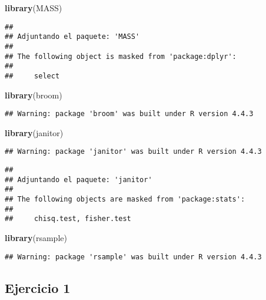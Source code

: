 \documentclass[
]{article}
\newenvironment{Shaded}{\begin{snugshade}}{\end{snugshade}}
\newcommand{\FunctionTok}[1]{\textcolor[rgb]{0.13,0.29,0.53}{\textbf{#1}}}
\newcommand{\NormalTok}[1]{#1}
\begin{document}
\begin{Shaded}
\begin{Highlighting}[]
\FunctionTok{library}\NormalTok{(MASS)}
\end{Highlighting}
\end{Shaded}

\begin{verbatim}
## 
## Adjuntando el paquete: 'MASS'
## 
## The following object is masked from 'package:dplyr':
## 
##     select
\end{verbatim}

\begin{Shaded}
\begin{Highlighting}[]
\FunctionTok{library}\NormalTok{(broom) }
\end{Highlighting}
\end{Shaded}

\begin{verbatim}
## Warning: package 'broom' was built under R version 4.4.3
\end{verbatim}

\begin{Shaded}
\begin{Highlighting}[]
\FunctionTok{library}\NormalTok{(janitor)   }
\end{Highlighting}
\end{Shaded}

\begin{verbatim}
## Warning: package 'janitor' was built under R version 4.4.3
\end{verbatim}

\begin{verbatim}
## 
## Adjuntando el paquete: 'janitor'
## 
## The following objects are masked from 'package:stats':
## 
##     chisq.test, fisher.test
\end{verbatim}

\begin{Shaded}
\begin{Highlighting}[]
\FunctionTok{library}\NormalTok{(rsample)}
\end{Highlighting}
\end{Shaded}

\begin{verbatim}
## Warning: package 'rsample' was built under R version 4.4.3
\end{verbatim}

\subsection{Ejercicio 1}\label{ejercicio-1}
\end{document}
